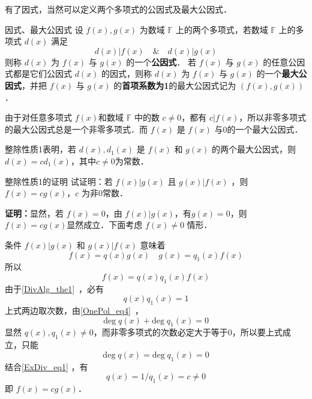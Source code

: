 有了因式，当然可以定义两个多项式的公因式及最大公因式．
\begin{definition}{因式、最大公因式}
设 $f(x),g(x)$ 为数域 $\mathbb{F}$ 上的两个多项式，若数域 $\mathbb{F}$ 上的多项式 $d(x)$ 满足
\begin{equation}
d(x)|f(x)\quad\&\quad d(x)|g(x)
\end{equation}
则称 $d(x)$ 为 $f(x)$ 与 $g(x)$ 的一个\textbf{公因式}．
若 $f(x)$ 与 $g(x)$ 的任意公因式都是它们公因式 $d(x)$ 的因式，则称 $d(x)$ 为 $f(x)$ 与 $g(x)$ 的一个\textbf{最大公因式}，并把 $f(x)$ 与 $g(x)$ 的\textbf{首项系数为1}的最大公因式记为 $(f(x),g(x))$．
\end{definition}

由于对任意多项式 $f(x)$和数域 $\mathbb{F}$ 中的数 $c\neq 0$，都有 $c|f(x)$，所以非零多项式的最大公因式总是一个非零多项式．而 $f(x)$ 是 $f(x)$ 与0的一个最大公因式．

整除性质1表明，若 $d(x),d_1(x)$ 是 $f(x)$ 和 $g(x)$ 的两个最大公因式，则 $d(x)=cd_1(x)$，其中$c\neq 0$为常数．
\begin{example}{整除性质1的证明}
试证明：若 $f(x)|g(x)$ 且 $g(x)|f(x)$ ，则 $f(x)=cg(x)$，$c$ 为非0常数．

\textbf{证明：}显然，若 $f(x)=0$，由 $f(x)|g(x)$，有$g(x)=0$，则 $f(x)=cg(x)$显然成立．下面考虑 $f(x)\neq 0$ 情形．

条件 $f(x)|g(x)$ 和 $g(x)|f(x)$ 意味着
\begin{equation}
f(x)=q(x)g(x)\quad g(x)=q_1(x)f(x)
\end{equation}
所以
\begin{equation}
f(x)=q(x)q_1(x)f(x)
\end{equation}
由于\autoref{DivAlg_the1}~，必有
\begin{equation}\label{ExDiv_eq1}
q(x)q_1(x)=1
\end{equation}
上式两边取次数，由\autoref{OnePol_eq4}~，
\begin{equation}
\mathrm{deg}\;q(x)+\mathrm{deg}\;q_1(x)=0
\end{equation}
显然 $q(x),q_1(x)\neq 0$，而非零多项式的次数必定大于等于0，所以要上式成立，只能
\begin{equation}
\mathrm{deg}\;q(x)=\mathrm{deg}\;q_1(x)=0
\end{equation}
结合\autoref{ExDiv_eq1} ，有
 \begin{equation}
 q(x)=1/q_1(x)=c\neq 0
 \end{equation}
 即 $f(x)=cg(x)$．

\end{example}

